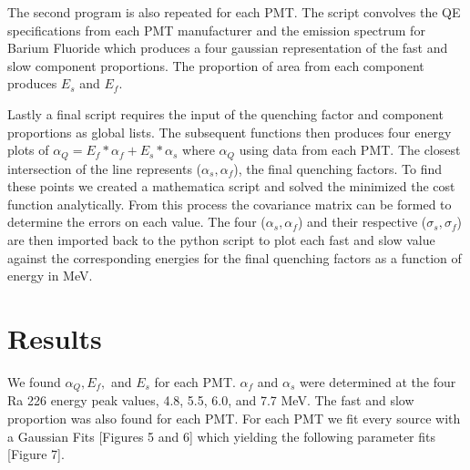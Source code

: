 \documentclass{article}
\begin{document}
The second program is also repeated for each PMT. The script convolves the QE specifications from each PMT manufacturer and the emission spectrum for Barium Fluoride which produces a four gaussian representation of the fast and slow component proportions. The proportion of area from each component produces $E_s$ and $E_f$. 

Lastly a final script requires the input of the quenching factor and component proportions as global lists. The subsequent functions then produces four energy plots of $\alpha_Q = E_f * \alpha_f + E_s * \alpha_s$ where $\alpha_Q$ using data from each PMT. The closest intersection of the line represents ($\alpha_s, \alpha_f$), the final quenching factors. To find these points we created a mathematica script and solved the minimized the cost function analytically. From this process the covariance matrix can be formed to determine the errors on each value. The four ($\alpha_s, \alpha_f$) and their respective ($\sigma_s, \sigma_f$) are then imported back to the python script to plot each fast and slow value against the corresponding energies for the final quenching factors as a function of energy in MeV. 


\section{Results}

We found $\alpha_Q, E_f,$ and $E_s$ for each PMT. $\alpha_f$ and $\alpha_s$ were determined at the four Ra 226 energy peak values, 4.8, 5.5, 6.0, and 7.7 MeV. The fast and slow proportion was also found for each PMT. For each PMT we fit every source with a Gaussian Fits [Figures 5 and 6] which yielding the following parameter fits [Figure 7]. 
\end{document}
